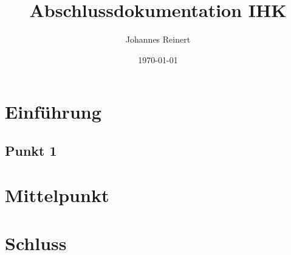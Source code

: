 \documentclass[a4paper]{article}
\title{Abschlussdokumentation IHK}
\author{Johannes Reinert}
\date{\today}
\begin{document}
\maketitle
\newpage

\tableofcontents

\newpage

\section{Einführung}
\subsection{Punkt 1}

\section{Mittelpunkt}

\section{Schluss}
\end{document}
